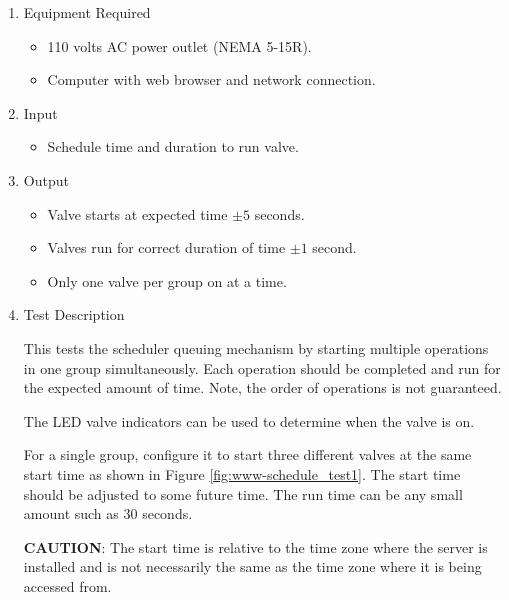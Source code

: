 \documentclass{article}
\begin{document}
\begin{enumerate}
\item Equipment Required
	\begin{itemize}
	\item 110 volts AC power outlet (NEMA 5-15R).
	\item Computer with web browser and network connection.
	\end{itemize}
\item Input
	\begin{itemize}
	\item Schedule time and duration to run valve.
	\end{itemize}
\item Output
	\begin{itemize}
	\item Valve starts at expected time $\pm5$ seconds.
	\item Valves run for correct duration of time $\pm1$ second.
	\item Only one valve per group on at a time.
	\end{itemize}

\item Test Description \\
\vspace{0.5em}

This tests the scheduler queuing mechanism by starting multiple
operations in one group simultaneously.
Each operation should be completed and run for the expected amount
of time. Note, the order of operations is not guaranteed.

The LED valve indicators can be used to determine when the valve is on.

For a single group, configure it to start three different valves
at the same start time as shown in Figure \ref{fig:www-schedule_test1}.
The start time should be adjusted to some future time.
The run time can be any small amount such as 30 seconds. \\

\begin{framed}
\textbf{CAUTION}: The start time is relative to the time zone where
the server is installed and is not necessarily the same as the
time zone where it is being accessed from.
\end{framed}


\end{enumerate}
\end{document}
